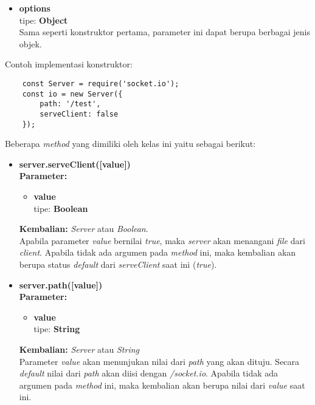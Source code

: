 \begin{enumerate}
\begin{itemize}
		\begin{itemize}
			\item \textbf{options} \\ tipe: \textbf{Object} \\ Sama seperti konstruktor pertama, parameter ini dapat berupa berbagai jenis objek.
		\end{itemize}
	
	Contoh implementasi konstruktor:
	
	\begin{lstlisting}
	const Server = require('socket.io');
	const io = new Server({
		path: '/test',
		serveClient: false
	});
	\end{lstlisting}
	
	\end{itemize}

	Beberapa \textit{method} yang dimiliki oleh kelas ini yaitu sebagai berikut: 
	
		\begin{itemize}
			\item \textbf{server.serveClient([value])} \\ 
			\textbf{Parameter:}
			\begin{itemize}
				\item \textbf{value} \\ tipe: \textbf{Boolean}
			\end{itemize}
			\textbf{Kembalian:} \textit{Server} atau \textit{Boolean}. \\
			Apabila parameter \textit{value} bernilai \textit{true}, maka \textit{server} akan menangani \textit{file} dari \textit{client}. Apabila tidak ada argumen pada \textit{method} ini, maka kembalian akan berupa status \textit{default} dari \textit{serveClient} saat ini (\textit{true}).
			
			\item \textbf{server.path([value])} \\
			\textbf{Parameter:}
			\begin{itemize}
				\item \textbf{value} \\ tipe: \textbf{String}
			\end{itemize}
			\textbf{Kembalian:} \textit{Server} atau \textit{String} \\
			Parameter \textit{value} akan menunjukan nilai dari \textit{path} yang akan dituju. Secara \textit{default} nilai dari \textit{path} akan diisi dengan \textit{/socket.io}. Apabila tidak ada argumen pada \textit{method} ini, maka kembalian akan berupa nilai dari \textit{value} saat ini.
			

\end{itemize}
\end{enumerate}
